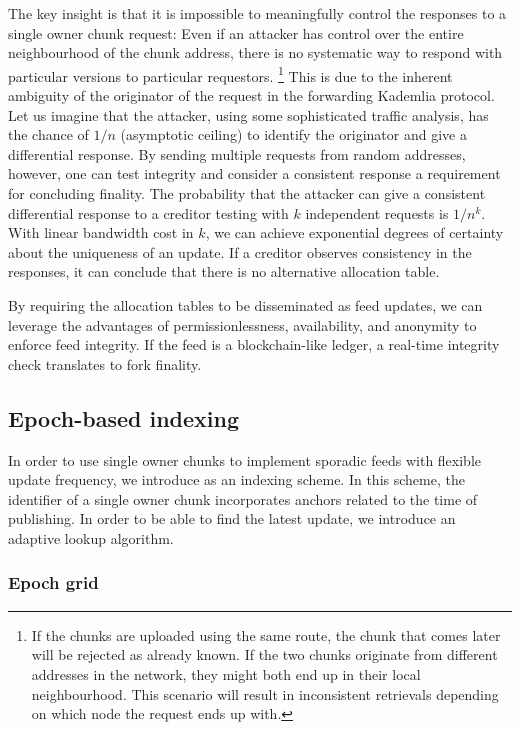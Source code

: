 The key insight is that it is impossible to meaningfully control the responses to a single owner chunk request: Even if an attacker has control over the entire neighbourhood of the chunk address, there is no systematic way to respond with particular versions to particular requestors.%
%
\footnote{If the chunks are uploaded using the same route, the chunk that comes later will be rejected as already known. If the two chunks originate from different addresses in the network, they might both end up in their local neighbourhood. This scenario will result in inconsistent retrievals depending on which node the request ends up with.}
%
This is due to the inherent ambiguity of the originator of the request in the forwarding Kademlia protocol. Let us imagine that the attacker, using some sophisticated traffic analysis, has the chance of $1/n$ (asymptotic ceiling) to identify the originator and give a differential response. By sending multiple requests from random addresses, however, one can test integrity and consider a consistent response a requirement for concluding finality. The probability that the attacker can give a consistent differential response to a creditor testing with $k$ independent requests is $1/n^k$. With linear bandwidth cost in $k$, we can achieve exponential degrees of certainty about the uniqueness of an update. If a creditor observes consistency in the responses, it can conclude that there is no alternative allocation table.


By requiring the allocation tables to be disseminated as feed updates, we can leverage the advantages of permissionlessness, availability, and anonymity to enforce feed integrity. If the feed is a blockchain-like ledger, a real-time integrity check translates to fork finality. 


\subsection{Epoch-based 
indexing \statusyellow}\label{sec:epoch-based-feeds}

\yellow{}

In order to use single owner chunks to implement sporadic feeds with flexible update frequency, we introduce  as an indexing scheme. In this scheme, the identifier of a single owner chunk incorporates anchors related to the time of publishing. In order to be able to find the latest update, we introduce an adaptive lookup algorithm. 

\subsubsection{Epoch grid}

